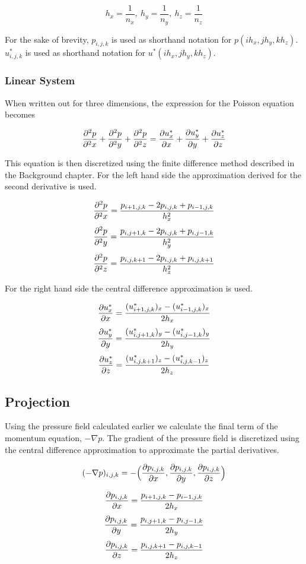 $$ h_x = \frac{1}{n_x}, ~ h_y = \frac{1}{n_y}, ~ h_z = \frac{1}{n_z} $$

For the sake of brevity, $p_{i, j, k}$ is used as shorthand notation for 
$p(ih_x, jh_y, kh_z)$. $u^*_{i, j, k}$ is used as shorthand notation for
$u^*(ih_x, jh_y, kh_z)$.

\subsubsection{Linear System}

When written out for three dimensions, the expression for the Poisson equation
becomes

$$ \frac{\partial^2 p}{\partial^2 x} + \frac{\partial^2 p}{\partial^2 y} + \frac{\partial^2 p}{\partial^2 z} = \frac{\partial u^*_x}{\partial x} + \frac{\partial u^*_y}{\partial y} + \frac{\partial u^*_z}{\partial z} $$

This equation is then discretized using the finite difference method described
in the Background chapter. For the left hand side the approximation derived for 
the second derivative is used.

$$ \frac{\partial^2 p}{\partial^2 x} = \frac{p_{i+1, j, k} - 2p_{i, j, k} + p_{i-1, j, k}}{h_x^2} $$
$$ \frac{\partial^2 p}{\partial^2 y} = \frac{p_{i, j+1, k} - 2p_{i, j, k} + p_{i, j-1, k}}{h_y^2} $$
$$ \frac{\partial^2 p}{\partial^2 z} = \frac{p_{i, j, k+1} - 2p_{i, j, k} + p_{i, j, k+1}}{h_z^2} $$

For the right hand side the central difference approximation is used.

$$ \frac{\partial u^*_x}{\partial x} = \frac{(u^*_{i+1, j, k})_x - (u^*_{i-1, j, k})_x}{2h_x} $$
$$ \frac{\partial u^*_y}{\partial y} = \frac{(u^*_{i, j+1, k})_y - (u^*_{i, j-1, k})_y}{2h_y} $$
$$ \frac{\partial u^*_z}{\partial z} = \frac{(u^*_{i, j, k+1})_z - (u^*_{i, j, k-1})_z}{2h_z} $$

\subsection{Projection}

Using the pressure field calculated earlier we calculate the final term of the 
momentum equation, $-\nabla p$. The gradient of the pressure field is discretized 
using the central difference approximation to approximate the partial derivatives.

$$ (-\nabla p)_{i,j,k} = -\Big( \frac{\partial p_{i,j,k}}{\partial x}, \frac{\partial p_{i,j,k}}{\partial y}, \frac{\partial p_{i,j,k}}{\partial z} \Big) $$

$$ \frac{\partial p_{i,j,k}}{\partial x} = \frac{p_{i+1,j,k} - p_{i-1,j,k}}{2h_x} $$
$$ \frac{\partial p_{i,j,k}}{\partial y} = \frac{p_{i,j+1,k} - p_{i,j-1,k}}{2h_y} $$
$$ \frac{\partial p_{i,j,k}}{\partial z} = \frac{p_{i,j,k+1} - p_{i,j,k-1}}{2h_z} $$

